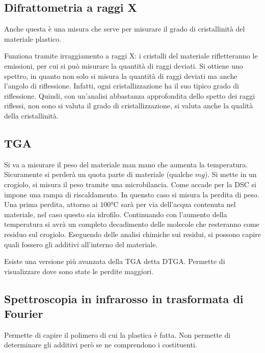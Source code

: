 \subsection{Difrattometria a raggi X}
Anche questa è una misura che serve per misurare il grado di cristallinità del materiale plastico.

Funziona tramite irraggiamento a raggi X: i cristalli del materiale rifletteranno le emissioni, per cui si può misurare la quantità di raggi deviati.
Si ottiene uno spettro, in quanto non solo si misura la quantità di raggi deviati ma anche l'angolo di riflessione.
Infatti, ogni cristallizzazione ha il suo tipico grado di riflessione.
Quindi, con un'analisi abbastanza approfondita dello spetto dei raggi riflessi, non sono si valuta il grado di cristallizzazione, si valuta anche la qualità della cristallinità.

\subsection{TGA}
Si va a misurare il peso del materiale man mano che aumenta la temperatura.
Sicuramente si perderà un quota parte di materiale (qualche $mg$).
Si mette in un crogiolo, si misura il peso tramite una microbilancia. Come accade per la \ac{DSC} si impone una rampa di riscaldamento. In quensto caso si misura la perdita di peso.
Una prima perdita, attorno ai $100\unit{\celsius}$ sarà per via dell'acqua contenuta nel materiale, nel caso questo sia idrofilo.
Continuando con l'aumento della temperatura si avrà un completo decadimento delle molecole che resteranno come residuo sul crogiolo.
Eseguendo delle analisi chimiche sui residui, si possono capire quali fossero gli additivi all'interno del materiale.

Esiste una versione più avanzata della \ac{TGA} detta \ac{DTGA}.
Permette di visualizzare dove sono state le perdite maggiori.

\subsection{Spettroscopia in infrarosso in trasformata di Fourier}
Permette di capire il polimero di cui la plastica è fatta. Non permette di determinare gli additivi però se ne comprendono i costituenti.